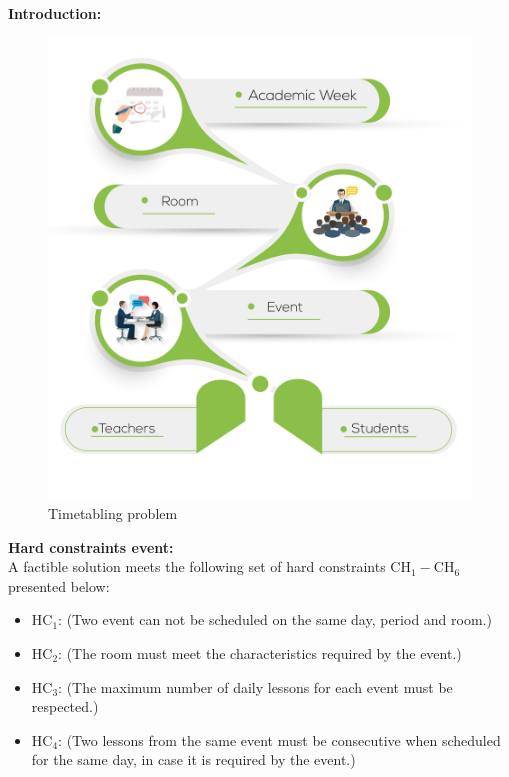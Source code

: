 \documentclass[centering]{report}
\newenvironment{slide}
    {\newpage
    \vspace*{\fill}
    }
    { 
     \vspace*{\fill}
    }
\begin{document}
\begin{slide}
\textbf{Introduction:}\\

\begin{figure}[h!]
  \centering
  \includegraphics[width=0.65\linewidth]{timetabling.png}
  \caption{\label{fig:timetabling}Timetabling problem}
\end{figure}

\end{slide}


\begin{slide}
\textbf{Hard constraints event:}\\

A factible solution meets the following set of hard constraints $ \mathrm{CH_{1}-CH_{6}} $ presented below:

\begin{itemize}
\item $\mathrm{HC_{1}}$: {\color{gray}(Two event can not be scheduled on the same day, period and room.)}
\item $\mathrm{HC_{2}}$: {\color{gray}(The room must meet the characteristics required by the event.)}
\item $\mathrm{HC_{3}}$: {\color{gray}(The maximum number of daily lessons for each event must be respected.)}
\item $\mathrm{HC_{4}}$: {\color{gray}(Two lessons from the same event must be consecutive when scheduled for the same  day, in case it is required by the event.)}
\end{itemize}

\end{slide}
\end{document}

